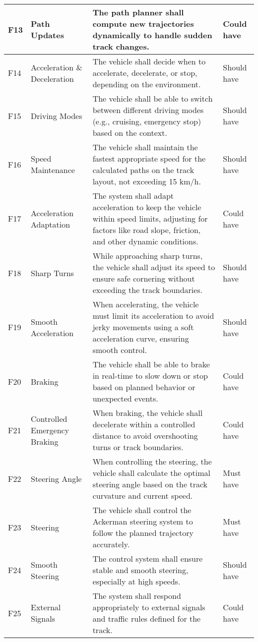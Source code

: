\begin{center}
\begin{longtable}{ | m{2em} | m{10em} | m{16em} | m{8em} | }
		\hline
		F13 & Path Updates & The path planner shall compute new trajectories dynamically to handle sudden track changes. & Could have\\
		\hline
		F14 & Acceleration \& Deceleration & The vehicle shall decide when to accelerate, decelerate, or stop, depending on the environment. & Should have\\
		\hline
		F15 & Driving Modes & The vehicle shall be able to switch between different driving modes (e.g., cruising, emergency stop) based on the context. & Should have\\
		\hline
		F16 & Speed Maintenance & The vehicle shall maintain the fastest appropriate speed for the calculated paths on the track layout, not exceeding 15 km/h. & Should have\\
		\hline
		F17 & Acceleration Adaptation & The system shall adapt acceleration to keep the vehicle within speed limits, adjusting for factors like road slope, friction, and other dynamic conditions. & Could have\\
		\hline
		F18 & Sharp Turns & While approaching sharp turns, the vehicle shall adjust its speed to ensure safe cornering without exceeding the track boundaries. & Should have\\
		\hline
		F19 & Smooth Acceleration & When accelerating, the vehicle must limit its acceleration to avoid jerky movements using a soft acceleration curve, ensuring smooth control. & Should have\\
		\hline
		F20 & Braking & The vehicle shall be able to brake in real-time to slow down or stop based on planned behavior or unexpected events. & Could have\\
		\hline
		F21 & Controlled Emergency Braking & When braking, the vehicle shall decelerate within a controlled distance to avoid overshooting turns or track boundaries. & Could have\\
		\hline
		F22 & Steering Angle & When controlling the steering, the vehicle shall calculate the optimal steering angle based on the track curvature and current speed. & Must have\\
		\hline
		F23 & Steering & The vehicle shall control the Ackerman steering system to follow the planned trajectory accurately. & Must have\\
		\hline
		F24 & Smooth Steering & The control system shall ensure stable and smooth steering, especially at high speeds. & Should have\\
		\hline
		F25 & External Signals & The system shall respond appropriately to external signals and traffic rules defined for the track. & Could have\\

\end{longtable}
\end{center}
